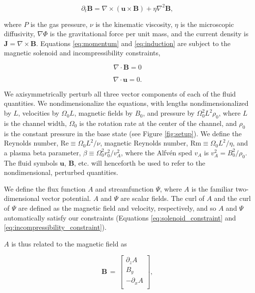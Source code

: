 \documentclass{emulateapj}
\newcommand{\beq}{\begin{equation}}
\newcommand{\eeq}{\end{equation}}
\newcommand\reye{\mathrm{Re}}
\newcommand\reym{\mathrm{Rm}}
\begin{document}
\beq\label{eq:induction}
\partial_t \mathbf{B} = \nabla \times \left(\mathbf{u} \times \mathbf{B}\right) + \eta\nabla^2\mathbf{B},
\eeq

where $P$ is the gas pressure, $\nu$ is the kinematic viscosity, $\eta$ is the microscopic diffusivity, $\nabla\Phi$ is the gravitational force per unit mass, and the current density is $\mathbf{J} = \nabla\times\mathbf{B}$.
Equations \ref{eq:momentum} and \ref{eq:induction} are subject to the magnetic solenoid and incompressibility constraints,

\beq\label{eq:solenoid_constraint}
\nabla \cdot \mathbf{B} = 0
\eeq

\beq\label{eq:incompressibility_constraint}
\nabla \cdot \mathbf{u} = 0.
\eeq

We axisymmetrically perturb all three vector components of each of the fluid quantities. We nondimensionalize the equations, with lengths nondimensionalized by $L$, velocities by $\Omega_0 L$, magnetic fields by $B_0$, and pressure by $\Omega_0^2 L^2 \rho_0$, where $L$ is the channel width, $\Omega_0$ is the rotation rate at the center of the channel, and $\rho_0$ is the constant pressure in the base state (see Figure \ref{fig:setup}). We define the Reynolds number, $\reye \equiv {\Omega_0 L^2}/{\nu}$, magnetic Reynolds number, $\reym \equiv {\Omega_0 L^2}/{\eta}$, and a plasma beta parameter, $\beta \equiv {\Omega_0^2r_0^2}/{v_A^2}$, where the Alfv\'en sped $v_A$ is $v_A^2 = {B_0^2}/{\rho_0}$. The fluid symbols $\mathbf{u}$, $\mathbf{B}$, etc. will henceforth be used to refer to the nondimensional, perturbed quantities.

We define the flux function $A$ and streamfunction $\Psi$, where $A$ is the familiar two-dimensional vector potential. $A$ and $\Psi$ are scalar fields. The curl of $A$ and the curl of $\Psi$ are defined as the magnetic field and velocity, respectively, and so $A$ and $\Psi$ automatically satisfy our constraints (Equations \ref{eq:solenoid_constraint} and \ref{eq:incompressibility_constraint}).

$A$ is thus related to the magnetic field as

\beq
\mathbf{B} \, = \, \left[\begin{matrix}
\partial_zA \\
B_{y} \\
-\partial_xA \\
\end{matrix}\right],\eeq \\
\end{document}

